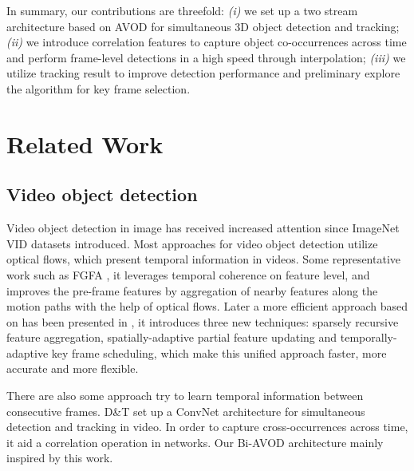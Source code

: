 \documentclass{bmvc2k}
\begin{document}
In summary, our contributions are threefold: \textit{(i)} we set up a two stream architecture based on AVOD for simultaneous 3D object detection and tracking; \textit{(ii)} we introduce correlation features to capture object co-occurrences across time and perform frame-level detections in a high speed through interpolation; \textit{(iii)} we utilize tracking result to improve detection performance and preliminary explore the algorithm for key frame selection. 
\section{Related Work}
\label{sec:related work}
\subsection{Video object detection}
Video object detection in image has received increased attention since ImageNet VID datasets introduced. Most approaches for video object detection utilize optical flows, which present temporal information in videos. Some representative work such as FGFA \cite{zhu2017flow}, it leverages temporal coherence on feature level, and improves the pre-frame features by aggregation of nearby features along the motion paths with the help of optical flows. Later a more efficient approach based on \cite{zhu2017flow} has been presented in \cite{zhu2018towards}, it introduces three new techniques: sparsely recursive feature aggregation, spatially-adaptive partial feature updating and temporally-adaptive key frame scheduling, which make this unified approach faster, more accurate and more flexible.

There are also some approach try to learn temporal information between consecutive frames. D\&T \cite{feichtenhofer2017detect} set up a ConvNet architecture for simultaneous detection and tracking in video. In order to capture cross-occurrences across time, it aid a correlation operation in networks. Our Bi-AVOD architecture mainly inspired by this work.
\end{document}
